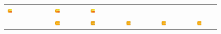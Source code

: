 \documentclass[landscape,9pt]{beamer}                           %
\begin{document}
\begin{frame}
\begin{figure}
\begin{tabular}{lccccc}
\includegraphics[width=0.16\textwidth,valign=t]{Immagini/simulazioni/TPStempo2.png}&
\includegraphics[width=0.16\textwidth,valign=t]{Immagini/simulazioni/SOAPtempo2.png}&
\includegraphics[width=0.16\textwidth,valign=t]{Immagini/simulazioni/STSRtempo2.png}\\
\parbox[t]{2mm}{}&
\includegraphics[width=0.16\textwidth,valign=t]{Immagini/simulazioni/REALEtempo3.png}&
\includegraphics[width=0.16\textwidth,valign=t]{Immagini/simulazioni/KRIGtempo3.png}&
\includegraphics[width=0.16\textwidth,valign=t]{Immagini/simulazioni/TPStempo3.png}&
\includegraphics[width=0.16\textwidth,valign=t]{Immagini/simulazioni/SOAPtempo3.png}&
\includegraphics[width=0.16\textwidth,valign=t]{Immagini/simulazioni/STSRtempo3.png}\\

\end{tabular}
\end{figure}
\end{frame}
\end{document}
